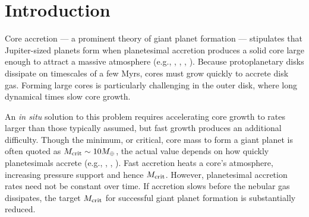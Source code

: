 \documentclass[apj]{emulateapj}
\begin{document}
\section{Introduction}
\label{intro}


Core accretion --- a prominent theory of giant planet formation --- stipulates that Jupiter-sized planets form when planetesimal accretion produces a solid core large enough to attract a massive atmosphere   (e.g., \citealt{mizuno78}, \citealt{stevenson82}, \citealt{boden86}, \citealt{dangelo11}). Because protoplanetary disks dissipate on timescales of a few Myrs, cores must grow quickly to accrete disk gas. Forming large cores is particularly challenging in the outer disk, where long dynamical times slow core growth. %

An \textit{in situ} solution to this problem requires accelerating core growth to rates larger than those typically assumed, but fast growth produces an additional difficulty.  Though the minimum, or critical, core mass to form a giant planet is often quoted as $M_{\rm crit}\sim 10M_{\oplus}$, the actual value depends on how quickly planetesimals accrete (e.g., \citealt{ikoma00}, \citealt{pollack96}, \citealt{rafikov06}).  Fast accretion heats a core's  atmosphere, increasing pressure support and hence $M_{\rm crit}$.   However, planetesimal accretion rates need not be constant over time.  If  accretion slows before the nebular gas dissipates, the target $M_{\rm crit}$ for successful giant planet formation is substantially reduced.
\end{document}
